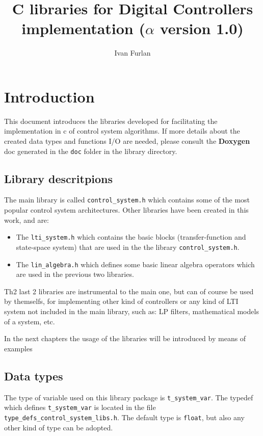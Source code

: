 \documentclass[12pt]{Template_}
\begin{document}
\title{C libraries for Digital Controllers implementation ($\alpha$ version 1.0)}
\author{Ivan Furlan}
\maketitle
\tableofcontents

\chapter{Introduction}
This document introduces the libraries developed for facilitating the implementation in c of control system algorithms.
If more details about the created data types and functions I/O are needed, please consult the {\bf Doxygen} doc generated in the \verb~doc~ folder in the library directory.

\section{Library descritpions}
The main library is called \verb~control_system.h~ which contains some of the most popular control system architectures. Other libraries have been created in this work, and are:
\begin{itemize}
\item The  \verb~lti_system.h~ which contains the basic blocks (transfer-function and state-space system) that are used in the the library \verb~control_system.h~. 
\item The  \verb~lin_algebra.h~ which defines some basic linear algebra operators which are used in the previous two libraries.
\end{itemize}
Th2 last 2 libraries are instrumental to the main one, but can of course be used by themselfs, for implementing other kind of controllers or any kind of LTI system not included in the main library, 
such as: LP filters, mathematical models of a system, etc. 


In the next chapters the usage of the libraries will be introduced by means of examples

\section{Data types}
The type of variable used on this library package is \verb~t_system_var~. The typedef which defines \verb~t_system_var~ is located in the file \verb~type_defs_control_system_libs.h~. 
The default type is \verb~float~, but also any other kind of type can be adopted.
\end{document}
